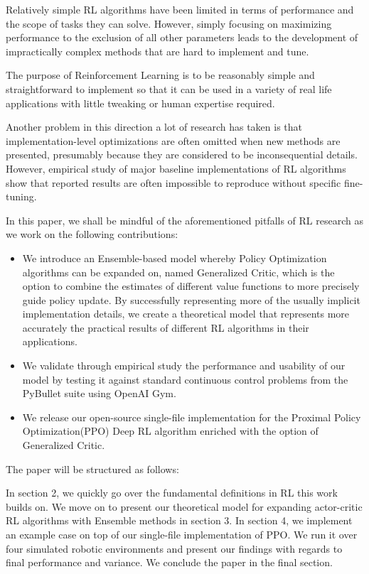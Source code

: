 Relatively simple RL algorithms have been limited in terms of performance and the scope of tasks they can solve. However, simply focusing on maximizing performance to the exclusion of all other parameters leads to the development of impractically complex methods that are hard to implement and tune.%

The purpose of Reinforcement Learning is to be reasonably simple and straightforward to implement so that it can be used in a variety of real life applications with little tweaking or human expertise required.

Another problem in this direction a lot of research has taken is that implementation-level optimizations are often omitted when new methods are presented, presumably because they are considered to be inconsequential details. However, empirical study of  major baseline implementations of RL algorithms show that reported results are often impossible to reproduce without specific fine-tuning\cite{henderson2018deep}\cite{islam2017reproducibility}\cite{andrychowicz2021matters}\cite{dossa2021empirical}.



In this paper, we shall be mindful of the aforementioned pitfalls of RL research as we work on the following contributions:

\begin{itemize}
\item We introduce an Ensemble-based model whereby Policy Optimization algorithms can be expanded on, named Generalized Critic, which is the option to combine the estimates of different value functions to more precisely guide policy update. By successfully representing more of the usually implicit implementation details, we create a theoretical model that represents more accurately the practical results of different RL algorithms in their applications.
\item We validate through empirical study the performance and usability of our model by testing it against standard continuous control problems from the PyBullet suite using OpenAI Gym.
\item We release our open-source single-file implementation for the Proximal Policy Optimization\cite{schulman2017proximal}(PPO) Deep RL algorithm enriched with the option of Generalized Critic. 
\end{itemize}


The paper will be structured as follows:

In section 2, we quickly go over the fundamental definitions in RL this work builds on. We move on to present our theoretical model for expanding actor-critic RL algorithms with Ensemble methods in section 3. In section 4, we implement an example case on top of our single-file implementation of PPO. We run it over four simulated robotic environments and present our findings with regards to final performance and variance. We conclude the paper in the final section.